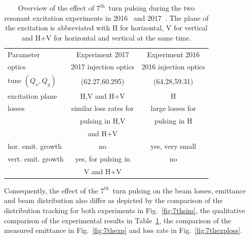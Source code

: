 \documentclass[%
 reprint,
 amsmath,amssymb,
 aps,
prstab,
]{revtex4-1}
\begin{document}
\begin{table}[b]
	\caption{\label{tab:7thexp}%
		Overview of the effect of $7^{\mathrm{th}}$~turn pulsing during the two resonant excitation experiments in 2016~\cite{resexmd2016} and 2017~\cite{resexmd2017}. The plane of the excitation is abbreviated with H for horizontal, V for vertical and H+V for horizontal and vertical at the same time.
	}
	\begin{ruledtabular}
		\begin{tabular}{lcc}
			Parameter & Experiment 2017 & Experiment 2016  \\
			\colrule
			optics & 2017 injection optics & 2016 injection optics \\
			tune $(Q_x,Q_y)$ & (62.27,60.295) & (64.28,59.31)\\\hline
			excitation plane  & H,V and H+V&  H\\
			losses & similar loss rates for  & large losses for \\
			& pulsing in H,V &  pulsing in H \\
			&  and H+V & \\
			hor. emit. growth & no & yes, very small \\
			vert. emit. growth & yes, for pulsing in & no\\
			&  V and H+V & \\
		\end{tabular}
	\end{ruledtabular}
\end{table}
Consequently, the effect of the $7^{\mathrm{th}}$~turn pulsing on the beam losses, emittance and beam distribution also differ as depicted by the comparison of the distribution tracking for both experiments in Fig.~\ref{fig:7thsim}, the qualitative comparison of the experimental results in Table~\ref{tab:7thexp}, the comparison of the measured emittance in Fig.~\ref{fig:7thexp} and loss rate in Fig.~\ref{fig:7thexploss}.
\end{document}
